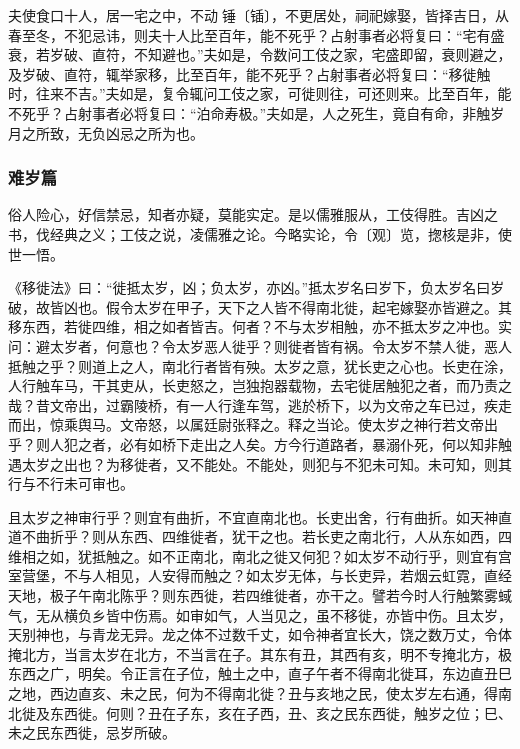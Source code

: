 \documentclass[]{article}
\begin{document}
夫使食口十人，居一宅之中，不动锤〔锸〕，不更居处，祠祀嫁娶，皆择吉日，从春至冬，不犯忌讳，则夫十人比至百年，能不死乎？占射事者必将复曰：``宅有盛衰，若岁破、直符，不知避也。''夫如是，令数问工伎之家，宅盛即留，衰则避之，及岁破、直符，辄举家移，比至百年，能不死乎？占射事者必将复曰：``移徙触时，往来不吉。''夫如是，复令辄问工伎之家，可徙则往，可还则来。比至百年，能不死乎？占射事者必将复曰：``泊命寿极。''夫如是，人之死生，竟自有命，非触岁月之所致，无负凶忌之所为也。

\hypertarget{header-n850}{%
\subsubsection{难岁篇}\label{header-n850}}

俗人险心，好信禁忌，知者亦疑，莫能实定。是以儒雅服从，工伎得胜。吉凶之书，伐经典之义；工伎之说，凌儒雅之论。今略实论，令〔观〕览，揔核是非，使世一悟。

《移徙法》曰：``徙抵太岁，凶；负太岁，亦凶。''抵太岁名曰岁下，负太岁名曰岁破，故皆凶也。假令太岁在甲子，天下之人皆不得南北徙，起宅嫁娶亦皆避之。其移东西，若徙四维，相之如者皆吉。何者？不与太岁相触，亦不抵太岁之冲也。实问：避太岁者，何意也？令太岁恶人徙乎？则徙者皆有祸。令太岁不禁人徙，恶人抵触之乎？则道上之人，南北行者皆有殃。太岁之意，犹长吏之心也。长吏在涂，人行触车马，干其吏从，长吏怒之，岂独抱器载物，去宅徙居触犯之者，而乃责之哉？昔文帝出，过霸陵桥，有一人行逢车驾，逃於桥下，以为文帝之车已过，疾走而出，惊乘舆马。文帝怒，以属廷尉张释之。释之当论。使太岁之神行若文帝出乎？则人犯之者，必有如桥下走出之人矣。方今行道路者，暴溺仆死，何以知非触遇太岁之出也？为移徙者，又不能处。不能处，则犯与不犯未可知。未可知，则其行与不行未可审也。

且太岁之神审行乎？则宜有曲折，不宜直南北也。长吏出舍，行有曲折。如天神直道不曲折乎？则从东西、四维徙者，犹干之也。若长吏之南北行，人从东如西，四维相之如，犹抵触之。如不正南北，南北之徙又何犯？如太岁不动行乎，则宜有宫室营堡，不与人相见，人安得而触之？如太岁无体，与长吏异，若烟云虹霓，直经天地，极子午南北陈乎？则东西徙，若四维徙者，亦干之。譬若今时人行触繁雾蜮气，无从横负乡皆中伤焉。如审如气，人当见之，虽不移徙，亦皆中伤。且太岁，天别神也，与青龙无异。龙之体不过数千丈，如令神者宜长大，饶之数万丈，令体掩北方，当言太岁在北方，不当言在子。其东有丑，其西有亥，明不专掩北方，极东西之广，明矣。令正言在子位，触土之中，直子午者不得南北徙耳，东边直丑巳之地，西边直亥、未之民，何为不得南北徙？丑与亥地之民，使太岁左右通，得南北徙及东西徙。何则？丑在子东，亥在子西，丑、亥之民东西徙，触岁之位；巳、未之民东西徙，忌岁所破。
\end{document}
